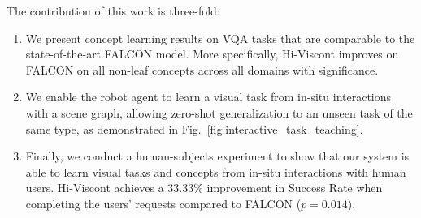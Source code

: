 % 
The contribution of this work is three-fold:
\begin{enumerate}[noitemsep,topsep=0pt,parsep=0pt,partopsep=0pt]
    \item We present concept learning results on VQA tasks that are comparable to the state-of-the-art FALCON model. More specifically, Hi-Viscont improves on FALCON on all non-leaf concepts across all domains with significance.
    \item We enable the robot agent to learn a visual task from in-situ interactions with a scene graph, allowing zero-shot generalization to an unseen task of the same type, as demonstrated in Fig.~\ref{fig:interactive_task_teaching}. 
    \item Finally, we conduct a human-subjects experiment to show that our system is able to learn visual tasks and concepts from in-situ interactions with human users. Hi-Viscont achieves a $33.33\%$ improvement in Success Rate when completing the users' requests compared to FALCON ($p=0.014$).
    
\end{enumerate}
